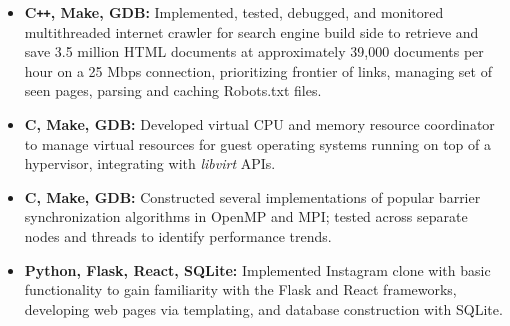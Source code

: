 \documentclass[overlapped]{res}
\begin{document}
\begin{resume}
\begin{itemize}[label={}]  \itemsep -2pt %
    \item \textbf{C\texttt{++}, Make, GDB:}
        Implemented, tested, debugged, and monitored multithreaded internet crawler
        for search engine build side to retrieve and save 3.5 million HTML documents
        at approximately 39,000 documents per hour on a 25 Mbps connection,
        prioritizing frontier of links, managing set of seen pages, parsing and caching Robots.txt files.
    \item \textbf{C, Make, GDB:}
        Developed virtual CPU and memory resource coordinator to manage
        virtual resources for guest operating systems running on top of a hypervisor,
        integrating with \textit{libvirt} APIs.
    \item \textbf{C, Make, GDB:}
        Constructed several implementations of popular barrier synchronization
        algorithms in OpenMP and MPI; tested across separate nodes and threads to identify
        performance trends.
    \item \textbf{Python, Flask, React, SQLite:}
        Implemented Instagram clone with basic functionality 
        to gain familiarity with the Flask and React frameworks, 
        developing web pages via templating, 
        and database construction with SQLite.

\end{itemize}
\end{resume}
\end{document}
